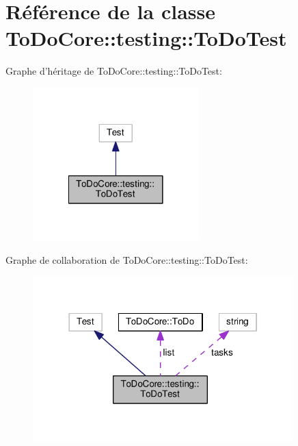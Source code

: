 \hypertarget{class_to_do_core_1_1testing_1_1_to_do_test}{\section{Référence de la classe To\+Do\+Core\+:\+:testing\+:\+:To\+Do\+Test}
\label{class_to_do_core_1_1testing_1_1_to_do_test}
}


Graphe d'héritage de To\+Do\+Core\+:\+:testing\+:\+:To\+Do\+Test\+:
\nopagebreak
\begin{figure}[H]
\begin{center}
\leavevmode
\includegraphics[width=182pt]{class_to_do_core_1_1testing_1_1_to_do_test__inherit__graph}
\end{center}
\end{figure}


Graphe de collaboration de To\+Do\+Core\+:\+:testing\+:\+:To\+Do\+Test\+:
\nopagebreak
\begin{figure}[H]
\begin{center}
\leavevmode
\includegraphics[width=285pt]{class_to_do_core_1_1testing_1_1_to_do_test__coll__graph}
\end{center}
\end{figure}
